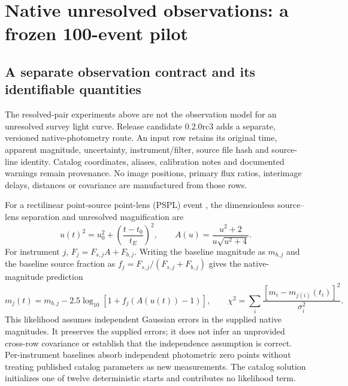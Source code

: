 \section{Native unresolved observations: a frozen 100-event pilot}
\label{sec:real-observations}

\subsection{A separate observation contract and its identifiable quantities}

The resolved-pair experiments above are not the observation model for an
unresolved survey light curve. Release candidate 0.2.0rc3 adds a separate,
versioned native-photometry route. An input row retains its original
time, apparent magnitude, uncertainty, instrument/filter, source file hash
and source-line identity. Catalog coordinates, aliases, calibration notes
and documented warnings remain provenance. No image positions, primary
flux ratios, interimage delays, distances or covariance are manufactured
from those rows.

For a rectilinear point-source point-lens (PSPL) event
\cite{Paczynski1986}, the dimensionless source--lens separation and
unresolved magnification are
\begin{equation}
 u(t)^2=u_0^2+\left(\frac{t-t_0}{t_E}\right)^2,\qquad
 A(u)=\frac{u^2+2}{u\sqrt{u^2+4}}.
 \label{eq:native-pspl}
\end{equation}
For instrument $j$, $F_j=F_{s,j}A+F_{b,j}$. Writing the baseline
magnitude as $m_{b,j}$ and the baseline source fraction as
$f_j=F_{s,j}/(F_{s,j}+F_{b,j})$ gives the native-magnitude prediction
\begin{equation}
 m_j(t)=m_{b,j}-2.5\log_{10}\!\left[1+f_j(A(u(t))-1)\right],\qquad
 \chi^2=\sum_i\frac{[m_i-m_{j(i)}(t_i)]^2}{\sigma_i^2}.
 \label{eq:native-magnitude-likelihood}
\end{equation}
This likelihood assumes independent Gaussian errors in the supplied
native magnitudes. It preserves the supplied errors; it does not infer
an unprovided cross-row covariance or establish that the independence
assumption is correct. Per-instrument baselines absorb independent
photometric zero points without treating published catalog parameters as
new measurements. The catalog solution initializes one of twelve
deterministic starts and contributes no likelihood term.

